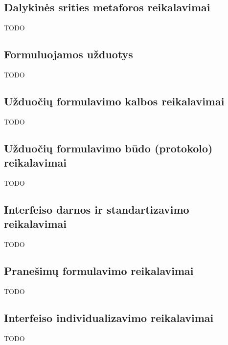 \subsection{Dalykinės srities metaforos reikalavimai}
TODO

\subsection{Formuluojamos užduotys}
TODO

\subsection{Užduočių formulavimo kalbos reikalavimai}
TODO

\subsection{Užduočių formulavimo būdo (protokolo) reikalavimai}
TODO

\subsection{Interfeiso darnos ir standartizavimo reikalavimai}
TODO

\subsection{Pranešimų formulavimo reikalavimai}
TODO

\subsection{Interfeiso individualizavimo reikalavimai}
TODO